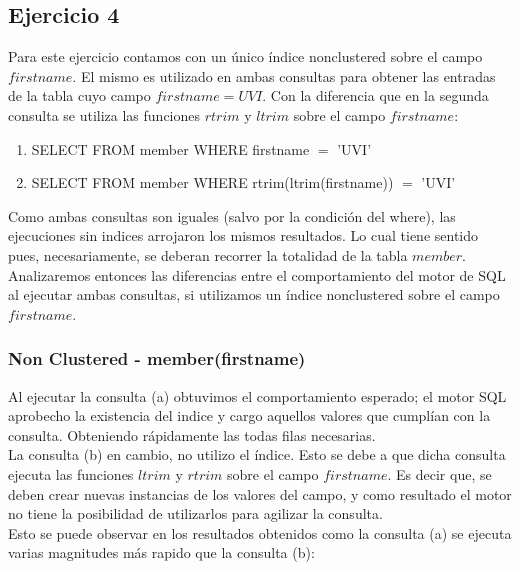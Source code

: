 \subsection{Ejercicio 4}

Para este ejercicio contamos con un único índice nonclustered sobre el campo $firstname$. El mismo es utilizado en ambas 
consultas para obtener las entradas de la tabla cuyo campo $firstname=UVI$. Con la diferencia que en la segunda consulta se 
utiliza las funciones $rtrim$ y $ltrim$ sobre el campo $firstname$:  
\begin{enumerate}[label=(\alph*)]
\item{SELECT \* FROM member WHERE firstname $=$ 'UVI'}

\item{SELECT \* FROM member WHERE rtrim(ltrim(firstname)) $=$ 'UVI'}

\end{enumerate}

Como ambas consultas son iguales (salvo por la condición del where), las ejecuciones sin indices arrojaron los mismos
resultados. Lo cual tiene sentido pues, necesariamente, se deberan recorrer la totalidad de la tabla $member$.\\

Analizaremos entonces las diferencias entre el comportamiento del motor de SQL al ejecutar ambas consultas, si utilizamos 
un índice nonclustered sobre el campo $firstname$.\\ 

\subsubsection{Non Clustered - member(firstname)}

Al ejecutar la consulta (a) obtuvimos el comportamiento esperado; el motor SQL aprobecho la existencia del indice y cargo 
aquellos valores que cumplían con la consulta. Obteniendo rápidamente las todas filas necesarias. \\%

La consulta (b) en cambio, no utilizo el índice. Esto se debe a que dicha consulta ejecuta las funciones $ltrim$ y $rtrim$ 
sobre el campo $firstname$. Es decir que, se deben crear nuevas instancias de los valores del campo, y como resultado 
el motor no tiene la posibilidad de utilizarlos para agilizar la consulta.\\%

Esto se puede observar en los resultados obtenidos como la consulta (a) se ejecuta varias magnitudes más rapido que la consulta (b):


